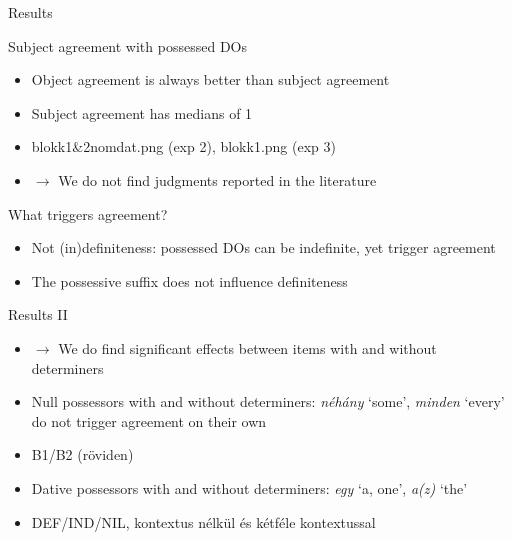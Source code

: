 \documentclass[12pt]{beamer}
\begin{document}
\begin{frame}{Results}

    \begin{block}{Subject agreement with possessed DOs}

        \begin{itemize}

        \item Object agreement is always better than subject agreement
        \item Subject agreement has medians of 1
        \item blokk1\&2nomdat.png (exp 2), blokk1.png (exp 3)

        \item \alert{$\to$} We do not find judgments reported in the literature

        \end{itemize}

    \end{block}

    \begin{block}{What triggers agreement?}

        \begin{itemize}

        \item Not (in){}definiteness: possessed DOs can be indefinite, yet
            trigger agreement

        \item The possessive suffix does not influence definiteness

        \end{itemize}

    \end{block}

\end{frame}

\begin{frame}{Results II}

    \begin{itemize}

        \item \alert{$\to$} We do find significant effects between items with
            and without determiners

        \item Null possessors with and without determiners: \emph{néhány}
            `some', \emph{minden} `every' do not trigger agreement on their own

        \item B1/B2 (röviden)

        \item Dative possessors with and without determiners: \emph{egy} `a,
            one', \emph{a(z)} `the'

        \item DEF/IND/NIL, kontextus nélkül és kétféle kontextussal

    \end{itemize}

\end{frame}
\end{document}
